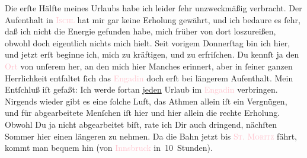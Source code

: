 \pstart
           Die erſte Hälfte meines Urlaubs habe ich leider ſehr unzweckmäßig verbracht. Der
               Aufenthalt in \textsc{\textcolor{pink}{Ischl}{}\ledrightnote{\textcolor{pink}{Bad Ischl}}} hat mir gar keine Erholung gewährt, und ich bedaure {\pb}es ſehr, daß ich nicht die Energie gefunden habe, mich
               früher von dort loszureißen, obwohl doch eigentlich nichts mich hielt. Seit vorigem
                  Donnerſtag bin ich hier, und jetzt erſt beginne
               ich, mich zu kräftigen, und zu erfriſchen. Du kennſt ja den \textcolor{pink}{Ort}{}\ledrightnote{{$\rightarrow$}\textcolor{pink}{Sankt Moritz-Bad}} von unſerem \label{K_L03080-2v}\label{K_L03080-2h} her, an den \strikeout{\textcolor{gray}{ich}} mich  hier Manches erinnert, aber in ſeiner ganzen Herrlichkeit entfaltet ſich das
                  \textcolor{pink}{Engadin}{}\ledrightnote{\textcolor{pink}{Engadin}} doch erſt bei längerem Aufenthalt.
               Mein Entſchluß iſt gefaßt: Ich werde fortan \uline{jeden}
               Urlaub im \textcolor{pink}{Engadin}{}\ledrightnote{\textcolor{pink}{Engadin}} verbringen. Nirgends wieder
               gibt es eine {\pb}ſolche Luft, das Athmen allein iſt ein
               Vergnügen, und für abgearbeitete Menſchen iſt hier und hier allein die rechte
               Erholung. Obwohl Du ja nicht abgearbeitet biſt, rate ich Dir auch dringend, nächſten
               Sommer hier einen längeren \label{K_L03080-3v}\label{K_L03080-3h} zu nehmen. Da die Bahn
               jetzt bis \textsc{\textcolor{pink}{St. Moritz}{}\ledrightnote{\textcolor{pink}{Sankt Moritz}}} fährt, kommt man bequem hin (von \textcolor{pink}{Innsbruck}{}\ledrightnote{\textcolor{pink}{Innsbruck}}
               in 10 Stunden).\pend
           
